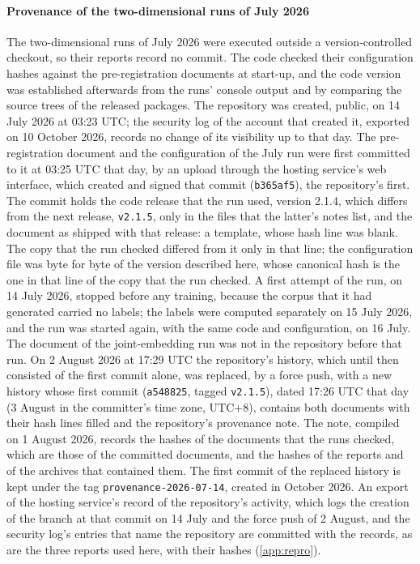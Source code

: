 \paragraph{Provenance of the two-dimensional runs of July 2026}
The two-dimensional runs of July 2026 were executed outside a version-controlled checkout,
so
their reports record no commit. The code checked their configuration hashes against the
pre-registration documents at start-up, and the code version was established afterwards
from the runs' console output and by comparing the source trees of the released packages.
The repository was created, public, on 14 July 2026 at 03:23 UTC; the security log of the
account that created it, exported on 10 October 2026, records no change of its visibility
up to that day. The pre-registration document and the configuration of the July run were
first committed to it at 03:25 UTC
that day, by an upload through the hosting service's web interface, which created and
signed that commit (\texttt{b365af5}), the repository's first. The commit holds the code
release that the run used, version 2.1.4, which differs from the next release,
\texttt{v2.1.5}, only in the files that the latter's notes list, and the document as
shipped with that release: a template, whose hash line was blank. The copy that the run
checked differed from it only in that line; the configuration file was byte for byte
 of the version described here, whose canonical hash is
the one in that line of the copy that the run checked. A first attempt of the run, on 14
July 2026, stopped before any training, because the corpus that it had generated carried no
labels; the labels were computed separately on 15 July 2026, and the run was started again,
with the same code and configuration, on 16 July. The document of the joint-embedding run
was not in the repository before that run. On 2 August 2026 at 17:29 UTC the repository's
history, which until then consisted of the first commit alone, was replaced, by a force
push, with a new history whose first commit (\texttt{a548825}, tagged \texttt{v2.1.5}),
dated 17:26 UTC that day (3 August in the committer's time zone, UTC+8), contains both
documents with their hash lines filled and the repository's provenance note. The note,
compiled on 1 August 2026, records the hashes of the documents that the runs checked, which
are those of the committed documents, and the hashes of the reports and of the archives
that contained them. The first commit of the replaced history is kept under the tag
\texttt{provenance-2026-07-14}, created in October 2026. An export of the hosting service's
record of the repository's activity, which logs the creation of the branch at that commit
on 14 July and the force push of 2 August, and the security log's entries that name the
repository are committed with the records, as are the three reports used here, with their
hashes (\ref{app:repro}).

